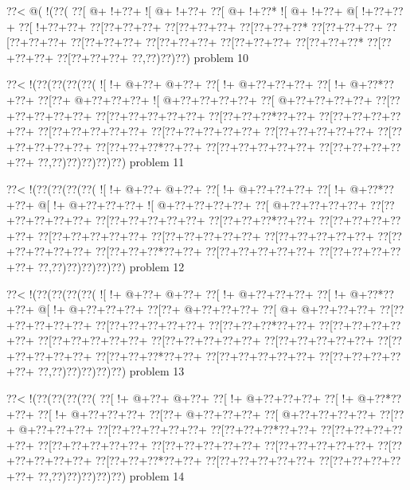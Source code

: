 \vbox{\vbox{\goo
\0??<\- @(\- !(\0??(
\0??[\- @+\- !+\0??+
\- ![\- @+\- !+\0??+
\0??[\- @+\- !+\0??*
\- ![\- @+\- !+\0??+
\- @[\- !+\0??+\0??+
\0??[\- !+\0??+\0??+
\0??[\0??+\0??+\0??+
\0??[\0??+\0??+\0??+
\0??[\0??+\0??+\0??*
\0??[\0??+\0??+\0??+
\0??[\0??+\0??+\0??+
\0??[\0??+\0??+\0??+
\0??[\0??+\0??+\0??+
\0??[\0??+\0??+\0??+
\0??[\0??+\0??+\0??*
\0??[\0??+\0??+\0??+
\0??[\0??+\0??+\0??+
\0??,\0??)\0??)\0??)
}
\hfil problem 10\hfil\break
}

\vbox{\vbox{\goo
\0??<\- !(\0??(\0??(\0??(\0??(
\- ![\- !+\- @+\0??+\- @+\0??+
\0??[\- !+\- @+\0??+\0??+\0??+
\0??[\- !+\- @+\0??*\0??+\0??+
\0??[\0??+\- @+\0??+\0??+\0??+
\- ![\- @+\0??+\0??+\0??+\0??+
\0??[\- @+\0??+\0??+\0??+\0??+
\0??[\0??+\0??+\0??+\0??+\0??+
\0??[\0??+\0??+\0??+\0??+\0??+
\0??[\0??+\0??+\0??*\0??+\0??+
\0??[\0??+\0??+\0??+\0??+\0??+
\0??[\0??+\0??+\0??+\0??+\0??+
\0??[\0??+\0??+\0??+\0??+\0??+
\0??[\0??+\0??+\0??+\0??+\0??+
\0??[\0??+\0??+\0??+\0??+\0??+
\0??[\0??+\0??+\0??*\0??+\0??+
\0??[\0??+\0??+\0??+\0??+\0??+
\0??[\0??+\0??+\0??+\0??+\0??+
\0??,\0??)\0??)\0??)\0??)\0??)
}
\hfil problem 11\hfil\break
}

\vbox{\vbox{\goo
\0??<\- !(\0??(\0??(\0??(\0??(
\- ![\- !+\- @+\0??+\- @+\0??+
\0??[\- !+\- @+\0??+\0??+\0??+
\0??[\- !+\- @+\0??*\0??+\0??+
\- @[\- !+\- @+\0??+\0??+\0??+
\- ![\- @+\0??+\0??+\0??+\0??+
\0??[\- @+\0??+\0??+\0??+\0??+
\0??[\0??+\0??+\0??+\0??+\0??+
\0??[\0??+\0??+\0??+\0??+\0??+
\0??[\0??+\0??+\0??*\0??+\0??+
\0??[\0??+\0??+\0??+\0??+\0??+
\0??[\0??+\0??+\0??+\0??+\0??+
\0??[\0??+\0??+\0??+\0??+\0??+
\0??[\0??+\0??+\0??+\0??+\0??+
\0??[\0??+\0??+\0??+\0??+\0??+
\0??[\0??+\0??+\0??*\0??+\0??+
\0??[\0??+\0??+\0??+\0??+\0??+
\0??[\0??+\0??+\0??+\0??+\0??+
\0??,\0??)\0??)\0??)\0??)\0??)
}
\hfil problem 12\hfil\break
}

\vbox{\vbox{\goo
\0??<\- !(\0??(\0??(\0??(\0??(
\- ![\- !+\- @+\0??+\- @+\0??+
\0??[\- !+\- @+\0??+\0??+\0??+
\0??[\- !+\- @+\0??*\0??+\0??+
\- @[\- !+\- @+\0??+\0??+\0??+
\0??[\0??+\- @+\0??+\0??+\0??+
\0??[\- @+\- @+\0??+\0??+\0??+
\0??[\0??+\0??+\0??+\0??+\0??+
\0??[\0??+\0??+\0??+\0??+\0??+
\0??[\0??+\0??+\0??*\0??+\0??+
\0??[\0??+\0??+\0??+\0??+\0??+
\0??[\0??+\0??+\0??+\0??+\0??+
\0??[\0??+\0??+\0??+\0??+\0??+
\0??[\0??+\0??+\0??+\0??+\0??+
\0??[\0??+\0??+\0??+\0??+\0??+
\0??[\0??+\0??+\0??*\0??+\0??+
\0??[\0??+\0??+\0??+\0??+\0??+
\0??[\0??+\0??+\0??+\0??+\0??+
\0??,\0??)\0??)\0??)\0??)\0??)
}
\hfil problem 13\hfil\break
}

\vbox{\vbox{\goo
\0??<\- !(\0??(\0??(\0??(\0??(
\0??[\- !+\- @+\0??+\- @+\0??+
\0??[\- !+\- @+\0??+\0??+\0??+
\0??[\- !+\- @+\0??*\0??+\0??+
\0??[\- !+\- @+\0??+\0??+\0??+
\0??[\0??+\- @+\0??+\0??+\0??+
\0??[\- @+\0??+\0??+\0??+\0??+
\0??[\0??+\- @+\0??+\0??+\0??+
\0??[\0??+\0??+\0??+\0??+\0??+
\0??[\0??+\0??+\0??*\0??+\0??+
\0??[\0??+\0??+\0??+\0??+\0??+
\0??[\0??+\0??+\0??+\0??+\0??+
\0??[\0??+\0??+\0??+\0??+\0??+
\0??[\0??+\0??+\0??+\0??+\0??+
\0??[\0??+\0??+\0??+\0??+\0??+
\0??[\0??+\0??+\0??*\0??+\0??+
\0??[\0??+\0??+\0??+\0??+\0??+
\0??[\0??+\0??+\0??+\0??+\0??+
\0??,\0??)\0??)\0??)\0??)\0??)
}
\hfil problem 14\hfil\break
}

